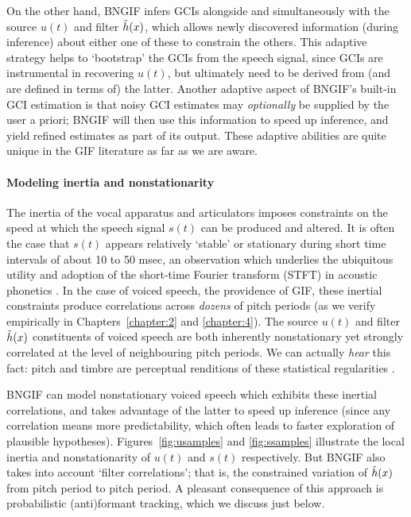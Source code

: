 \begin{chaptersections}
On the other hand, BNGIF infers GCIs alongside and simultaneously with the source $u(t)$ and filter $\tilde{h}(x)$, which allows newly discovered information (during inference) about either one of these to constrain the others.
This adaptive strategy helps to `bootstrap' the GCIs from the speech signal, since GCIs are instrumental in recovering $u(t)$, but ultimately need to be derived from (and are defined in terms of) the latter.
Another adaptive aspect of BNGIF's built-in GCI estimation is that noisy GCI estimates may \emph{optionally} be supplied by the user a priori; BNGIF will then use this information to speed up inference, and yield refined estimates as part of its output.
These adaptive abilities are quite unique in the GIF literature as far as we are aware.

\paragraph{Modeling inertia and nonstationarity}
The inertia of the vocal apparatus and articulators imposes constraints on the speed at which the speech signal $s(t)$ can be produced and altered.
It is often the case that $s(t)$ appears relatively `stable' or stationary during short time intervals of about 10 to 50 msec, an observation which underlies the ubiquitous utility and adoption of the short-time Fourier transform (STFT) in acoustic phonetics \citep{Little2011}.
In the case of voiced speech, the providence of GIF, these inertial constraints produce correlations across \emph{dozens} of pitch periods (as we verify empirically in Chapters~\ref{chapter:2} and \ref{chapter:4}).
The source $u(t)$ and filter $\tilde{h}(x)$ constituents of voiced speech are both inherently nonstationary yet strongly correlated at the level of neighbouring pitch periods.
We can actually \emph{hear} this fact: pitch and timbre are perceptual renditions of these statistical regularities \citep{Schnupp2011}.

BNGIF can model nonstationary voiced speech which exhibits these inertial correlations, and takes advantage of the latter to speed up inference (since any correlation means more predictability, which often leads to faster exploration of plausible hypotheses).
Figures~\ref{fig:usamples} and \ref{fig:ssamples} illustrate the local inertia and nonstationarity of $u(t)$ and $s(t)$ respectively.
But BNGIF also takes into account `filter correlations'; that is, the constrained variation of $\tilde{h}(x)$ from pitch period to pitch period.
A pleasant consequence of this approach is probabilistic (anti)formant tracking, which we discuss just below.


\end{chaptersections}
